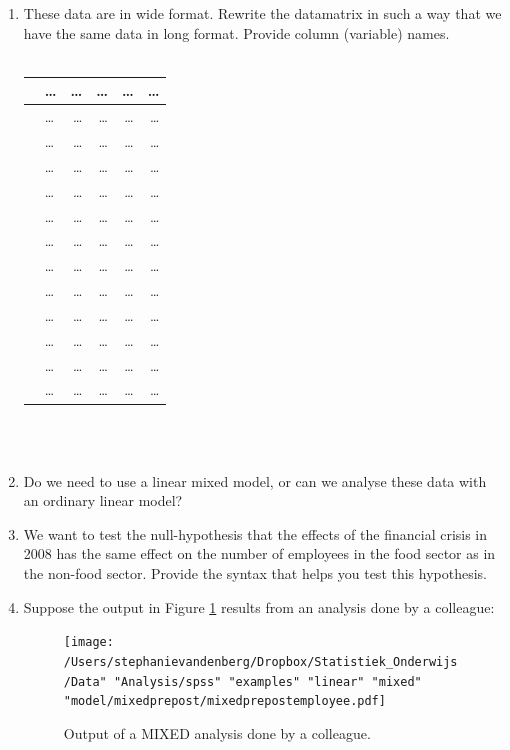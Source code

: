 \documentclass[]{book}\usepackage[]{graphicx}\usepackage[]{color}
\begin{document}
\begin{enumerate}
\item These data are in wide format. Rewrite the datamatrix in such a way that we have the same data in long format. Provide column (variable) names. 
\\
 \\
 \begin{tabular}{llrrrr}
   & \dots & \dots  & \dots & \dots  & \dots  \\ \hline
  & \dots & \dots  & \dots & \dots  & \dots  \\
  & \dots & \dots  & \dots & \dots  & \dots  \\
  & \dots & \dots  & \dots & \dots  & \dots  \\
  & \dots & \dots  & \dots & \dots  & \dots  \\
  & \dots & \dots  & \dots & \dots  & \dots  \\
  & \dots & \dots  & \dots & \dots  & \dots  \\
  & \dots & \dots  & \dots & \dots  & \dots  \\
  & \dots & \dots  & \dots & \dots  & \dots  \\
  & \dots & \dots  & \dots & \dots  & \dots  \\
  & \dots & \dots  & \dots & \dots  & \dots  \\
  & \dots & \dots  & \dots & \dots  & \dots  \\
  & \dots & \dots  & \dots & \dots  & \dots  \\
 \end{tabular}
\\
\\
\item Do we need to use a linear mixed model, or can we analyse these data with an ordinary linear model?
\item We want to test the null-hypothesis that the effects of the financial crisis in 2008 has the same effect on the number of employees in the food sector as in the non-food sector. Provide the syntax that helps you test this hypothesis. 
\item Suppose the output in Figure \ref{fig:mixedprepostemployee} results from an analysis done by a colleague:

\begin{figure}[h]
    \begin{center}
       \texttt{[image: /Users/stephanievandenberg/Dropbox/Statistiek\_Onderwijs/Data" "Analysis/spss" "examples" "linear" "mixed" "model/mixedprepost/mixedprepostemployee.pdf]}
    \end{center}
    \label{fig:mixedprepostemployee}
    \caption{Output of a MIXED analysis done by a colleague.}
\end{figure}


\end{enumerate}
\end{document}
